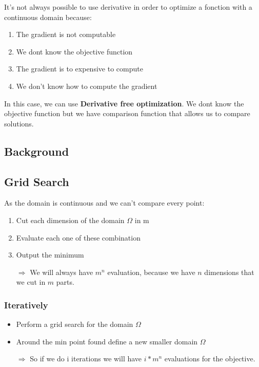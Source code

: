 
It's not always possible to use derivative in order to optimize a
fonction with a continuous domain because:
\begin{enumerate}
    \item  The gradient is not computable
    \item  We dont know the objective function
    \item  The gradient is to expensive to compute
    \item  We don't know how to compute the gradient
\end{enumerate}

In this case, we can use \textbf{Derivative free optimization}.
We dont know the objective function but we have comparison function that allows us to compare solutions.


\subsection{Background}

\subsection{Grid Search}

As the domain is continuous and we can't compare every point:
\begin{enumerate}
    \item Cut each dimension of the domain $\Omega$ in m
    \item Evaluate each one of these combination 
    \item Output the minimum

    \item[$\Rightarrow$]  We will always have $m^n$ evaluation,
        because we have $n$ dimensions that
we cut in $m$ parts.
\end{enumerate}

\subsubsection{Iteratively}
\begin{itemize}
    \item Perform a grid search for the domain $\Omega$ 
    \item Around the min point found define a new smaller domain
        $\Omega$ 
    \item[$\Rightarrow$] So if we do i iterations we will have $i *
        m^n$ evaluations for the objective.
\end{itemize}

